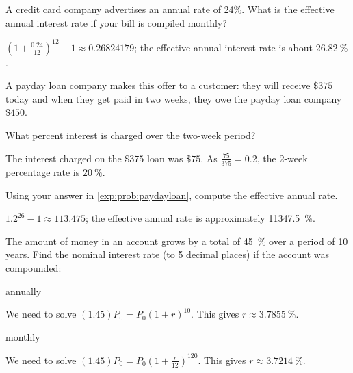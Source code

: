 \begin{exercises}
\begin{problem}
A credit card company advertises an annual rate of 24\%.  What is the effective annual interest rate if your bill is compiled monthly?
\begin{shortsolution}
	$\left(1+\frac{0.24}{12}\right)^{12}-1\approx 0.26824179$; the effective annual interest rate is about $\SI{26.82}{\percent}$.
\end{shortsolution}
\end{problem}
			
\begin{problem}
A payday loan company makes this offer to a customer: they will receive $\$375$ today and when they get paid in two weeks, they owe the payday loan company $\$450$.  
\begin{subproblem}\label{exp:prob:paydayloan}
	What percent interest is charged over the two-week period?
	\begin{shortsolution}
		The interest charged on the $\$375$ loan was $\$75$. As $\frac{75}{375}=0.2$, the 2-week percentage rate is $\SI{20}{\percent}$.
	\end{shortsolution}	
\end{subproblem}
\begin{subproblem}
	Using your answer in \cref{exp:prob:paydayloan}, compute the effective annual rate.
	\begin{shortsolution}
		$1.2^{26} - 1 \approx 113.475$; the effective annual rate is approximately \SI{11347.5}{\percent}.
	\end{shortsolution}
\end{subproblem}
\end{problem}
			
\begin{problem}
The amount of money in an account grows by a total of \SI{45}{\percent} over a period of 10 years. Find the nominal 
interest rate (to 5 decimal places) if the account was compounded:
\begin{multicols}{2}
	\begin{subproblem}
		annually
		\begin{shortsolution}
			We need to solve $(1.45)P_0=P_0(1+r)^{10}$. This gives $r\approx \SI{3.7855}{\percent}$.
		\end{shortsolution}
	\end{subproblem}
	\begin{subproblem}
		monthly
		\begin{shortsolution}
			We need to solve $(1.45)P_0=P_0\left( 1+\frac{r}{12} \right)^{120}$. This gives $r\approx \SI{3.7214}{\percent}$. 
		\end{shortsolution}
	\end{subproblem}
\end{multicols}
\end{problem}
\end{exercises}
			
